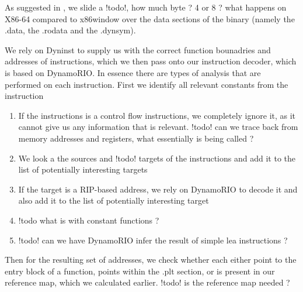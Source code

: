 
As suggested in \cite{ZhangSekar00}, we slide a {!todo!, how much byte ? 4 or 8 ? what happens on X86-64 compared to x86}window over the data sections of the binary (namely the .data, the .rodata and the .dynsym).



We rely on Dyninst \cite{dyninst00} to supply us with the correct function bounadries and addresses of instructions, which we then pass onto our instruction decoder, which is based on DynamoRIO. In essence there are types of analysis that are performed on each instruction. First we identify all relevant constants from the instruction
\begin{enumerate}
\item If the instructions is a control flow instructions, we completely ignore it, as it cannot give us any information that is relevant. {!todo! can we trace back from memory addresses and registers, what essentially is being called ?}
\item We look a the sources and {!todo! targets} of the instructions and add it to the list of potentially interesting targets
\item If the target is a RIP-based address, we rely on DynamoRIO to decode it and also add it to the list of potentially interesting target

\item {!todo what is with constant functions ?}
\item {!todo! can we have DynamoRIO infer the result of simple lea instructions ?}
\end{enumerate}

Then for the resulting set of addresses, we check whether each either point to the entry block of a function, points within the .plt section, or is present in our reference map, which we calculated earlier. {!todo! is the reference map needed ?}
